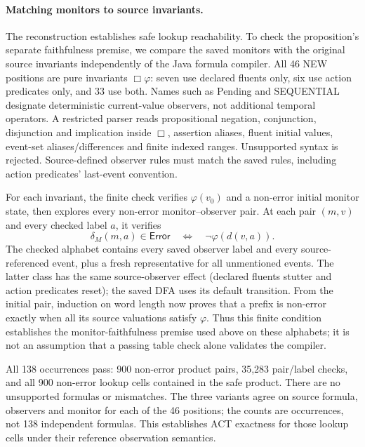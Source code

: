 \paragraph{Matching monitors to source invariants.}
The reconstruction establishes safe lookup reachability. To check the proposition's separate faithfulness premise, we compare the saved monitors with the original source invariants independently of the Java formula compiler. All 46 NEW positions are pure invariants $\Box\varphi$: seven use declared fluents only, six use action predicates only, and 33 use both. Names such as Pending and SEQUENTIAL designate deterministic current-value observers, not additional temporal operators. A restricted parser reads propositional negation, conjunction, disjunction and implication inside $\Box$, assertion aliases, fluent initial values, event-set aliases/differences and finite indexed ranges. Unsupported syntax is rejected. Source-defined observer rules must match the saved rules, including action predicates' last-event convention.

For each invariant, the finite check verifies $\varphi(v_0)$ and a non-error initial monitor state, then explores every non-error monitor--observer pair. At each pair $(m,v)$ and every checked label $a$, it verifies
\[
 \delta_M(m,a)\in\mathsf{Error}
 \quad\Longleftrightarrow\quad
 \neg\varphi(d(v,a)).
\]
The checked alphabet contains every saved observer label and every source-referenced event, plus a fresh representative for all unmentioned events. The latter class has the same source-observer effect (declared fluents stutter and action predicates reset); the saved DFA uses its default transition. From the initial pair, induction on word length now proves that a prefix is non-error exactly when all its source valuations satisfy $\varphi$. Thus this finite condition establishes the monitor-faithfulness premise used above on these alphabets; it is not an assumption that a passing table check alone validates the compiler.

All 138 occurrences pass: 900 non-error product pairs, 35,283 pair/label checks, and all 900 non-error lookup cells contained in the safe product. There are no unsupported formulas or mismatches. The three variants agree on source formula, observers and monitor for each of the 46 positions; the counts are occurrences, not 138 independent formulas. This establishes ACT exactness for those lookup cells under their reference observation semantics.


